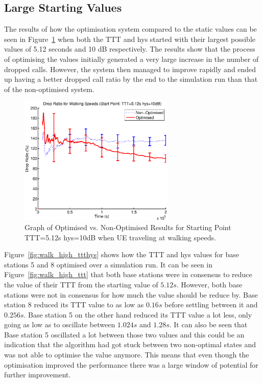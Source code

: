 \subsection{Large Starting Values}\label{walk_high}
The results of how the optimisation system compared to the static values can be seen in Figure~\ref{fig:walk_high_drop} when both the TTT and hys started with their largest possible values of 5.12 seconds and 10 dB respectively. The results show that the process of optimising the values initially generated a very large increase in the number of dropped calls. However, the system then managed to improve rapidly and ended up having a better dropped call ratio by the end to the simulation run than that of the non-optimised system.
\begin{figure}[H]
  \begin{center}
    	  \includegraphics[width=0.66\textwidth]{figures/walking_figures/walkhigh.eps}
    \end{center}
    \caption{Graph of Optimised vs. Non-Optimised Results for Starting Point TTT=5.12s hys=10dB when UE traveling at walking speeds.}
    \label{fig:walk_high_drop}
\end{figure}
Figure~\ref{fig:walk_high_ttthys} shows how the TTT and hys values for base stations  5 and 8 optimised over a simulation run. It can be seen in Figure~\ref{fig:walk_high_ttt} that both base stations were in consensus to reduce the value of their TTT from the starting value of $5.12 s$. However, both base stations were not in consensus for how much the value should be reduce by. Base station 8 reduced its TTT value to as low as $0.16 s$ before settling between it and $0.256 s$. Base station 5 on the other hand reduced its TTT value a lot less, only going as low as to oscillate between $1.024 s$ and $1.28 s$. It can also be seen that Base station 5 oscillated a lot between those two values and this could be an indication that the algorithm had got stuck between two non-optimal states and was not able to optimise the value anymore. This means that even though the optimisation improved the performance there was a large window of potential for further improvement.
 
